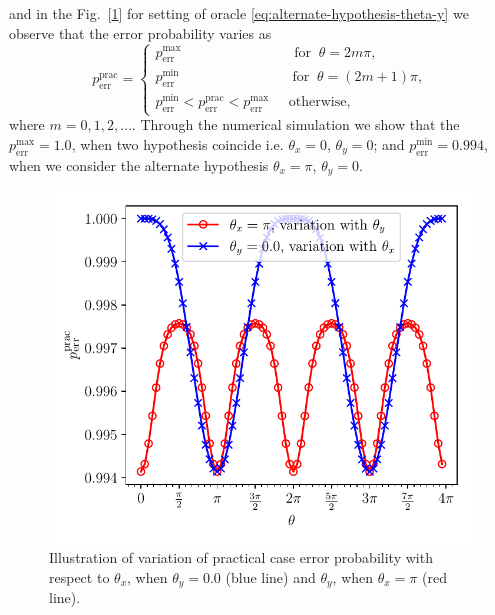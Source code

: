 \documentclass[%
 aps,
 jmp,%
 amsmath,amssymb,
 reprint,%
]{revtex4-2}
\begin{document}
and in the Fig.~[\ref{fig:prac_prob_with_thetas}] for setting of oracle \eqref{eq:alternate-hypothesis-theta-y} we observe that the error probability varies as
\[
p_\textrm{err}^\textrm{prac} = 
\begin{cases}
p_\textrm{err}^\textrm{max}\;\;\;\;\;\;\;\;\;\;\;\;\;\;\;\;\;\;\;\;\;\;\;\;\;\;\;\;\; \textrm{for}\;\; \theta = 2m\pi,\\

p_\textrm{err}^\textrm{min} \;\;\;\;\;\;\;\;\;\;\;\;\;\;\;\;\;\;\;\;\;\;\;\;\;\;\;\;\; \textrm{for}\;\; \theta = (2m+1)\pi,\\

p_\textrm{err}^\textrm{min}<p_\textrm{err}^\textrm{prac} <p_\textrm{err}^\textrm{max}\;\;\;\;\; \textrm{otherwise},
\end{cases}
\]
where $m=0,1,2,\ldots$.
Through the numerical simulation we show that the $p_\textrm{err}^\textrm{max} = 1.0$, when two hypothesis coincide i.e. $\theta_x = 0$, $\theta_y = 0$; and $p_\textrm{err}^\textrm{min} = 0.994$, when we consider the alternate hypothesis $\theta_x = \pi$, $\theta_y = 0$.
\begin{figure}[t!]
	\centering
	\includegraphics[width = 1.0\linewidth]{prac_prob_vs_thetas.pdf}
    \caption{Illustration of variation of practical case error probability with respect to $\theta_x$, when $\theta_y = 0.0$ (blue line)  and $\theta_y$, when $\theta_x = \pi$ (red line).}
	\label{fig:prac_prob_with_thetas}
\end{figure}
\end{document}
